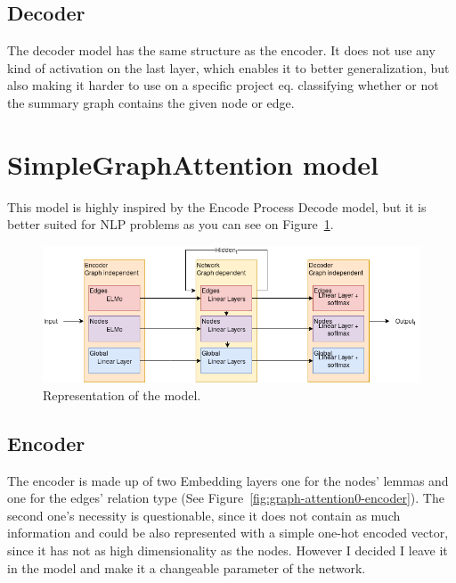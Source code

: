 \subsection{Decoder}
The decoder model has the same structure as the encoder. It does not use any kind of activation on the last layer, which enables it to better generalization, but also making it harder to use on a specific project eq. classifying whether or not the summary graph contains the given node or edge.

\section{SimpleGraphAttention model}
This model is highly inspired by the Encode Process Decode model, but it is better suited for NLP problems as you can see on Figure~\ref{fig:graph-attention0}.

\begin{figure}[!ht]
	\centering
	\includegraphics[width=150mm, keepaspectratio]{figures/GA0.png}
	\caption{Representation of the model.}
	\label{fig:graph-attention0}
\end{figure}

\subsection{Encoder}

The encoder is made up of two Embedding layers one for the nodes' lemmas and one for the edges' relation type (See Figure~\ref{fig:graph-attention0-encoder}). The second one's necessity is questionable, since it does not contain as much information and could be also represented with a simple one-hot encoded vector, since it has not as high dimensionality as the nodes. However I decided I leave it in the model and make it a changeable parameter of the network.

